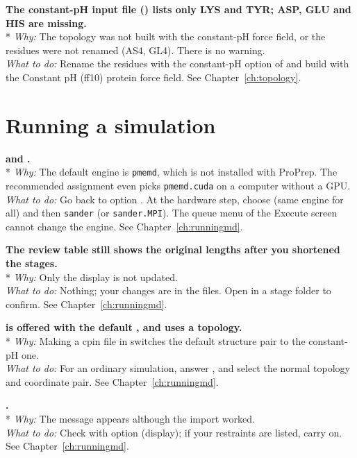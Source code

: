 {\bfseries The constant-pH input file () lists only LYS and TYR;
ASP, GLU and HIS are missing.}\\*
\emph{Why:} The topology was not built with the constant-pH force field, or
the residues were not renamed (AS4, GL4). There is no warning.\\
\emph{What to do:} Rename the residues with the constant-pH option of
 and build with the \textsf{Constant pH (ff10)} protein force field.
See Chapter~\ref{ch:topology}.

\section{Running a simulation}\label{sec:troubleshooting-md}

{\bfseries {} and .}\\*
\emph{Why:} The default engine is \texttt{pmemd}, which is not installed with
ProPrep. The recommended assignment even picks \texttt{pmemd.cuda} on a
computer without a GPU.\\
\emph{What to do:} Go back to  option . At the hardware step,
choose  (same engine for all) and then \texttt{sander} (or
\texttt{sander.MPI}). The queue menu of the Execute screen cannot change the
engine. See Chapter~\ref{ch:runningmd}.

{\bfseries The review table still shows the original lengths after you
shortened the stages.}\\*
\emph{Why:} Only the display is not updated.\\
\emph{What to do:} Nothing; your changes are in the files. Open
 in a stage folder to confirm. See
Chapter~\ref{ch:runningmd}.

{\bfseries {} is offered with the default
, and  uses a  topology.}\\*
\emph{Why:} Making a cpin file in  switches the default structure pair
to the constant-pH one.\\
\emph{What to do:} For an ordinary simulation, answer , and select the
normal topology and coordinate pair. See Chapter~\ref{ch:runningmd}.

{\bfseries {}.}\\*
\emph{Why:} The message appears although the import worked.\\
\emph{What to do:} Check with option  (display); if your restraints are
listed, carry on. See Chapter~\ref{ch:runningmd}.

